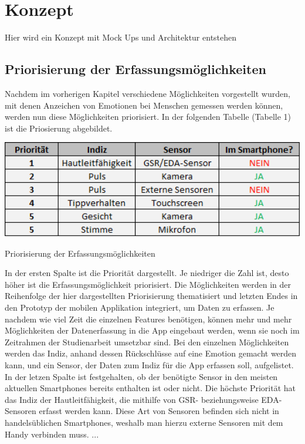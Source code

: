 \section{Konzept}
Hier wird ein Konzept mit Mock Ups und Architektur entstehen
\subsection{Priorisierung der Erfassungsmöglichkeiten}
Nachdem im vorherigen Kapitel verschiedene Möglichkeiten vorgestellt wurden, mit denen Anzeichen von Emotionen bei Menschen gemessen werden können, werden nun diese Möglichkeiten priorisiert. In der folgenden Tabelle (Tabelle 1) ist die Priosierung abgebildet. \newline
\begin{table}[h]
	\centering
	\includegraphics[width=14cm]{Bilder/prio.png}
	\caption[Priorisierung der Erfassungsmöglichkeiten]{Priorisierung der Erfassungsmöglichkeiten}
\end{table}%
\newline In der ersten Spalte ist die Priorität dargestellt. Je niedriger die Zahl ist, desto höher ist die Erfassungsmöglichkeit priorisiert. Die Möglichkeiten werden in der Reihenfolge der hier dargestellten Priorisierung thematisiert und letzten Endes in den Prototyp der mobilen Applikation integriert, um Daten zu erfassen. Je nachdem wie viel Zeit die einzelnen Features benötigen, können mehr und mehr Möglichkeiten der Datenerfassung in die App eingebaut werden, wenn sie noch im Zeitrahmen der Studienarbeit umsetzbar sind. Bei den einzelnen Möglichkeiten werden das Indiz, anhand dessen Rückschlüsse auf eine Emotion gemacht werden kann, und ein Sensor, der Daten zum Indiz für die App erfassen soll, aufgelistet. In der letzen Spalte ist festgehalten, ob der benötigte Sensor in den meisten aktuellen Smartphones bereits enthalten ist oder nicht. \newline
Die höchste Priorität hat das Indiz der Hautleitfähigkeit, die mithilfe von GSR- beziehungsweise EDA-Sensoren erfasst werden kann. Diese Art von Sensoren befinden sich nicht in handelsüblichen Smartphones, weshalb man hierzu externe Sensoren mit dem Handy verbinden muss. \newline
...

